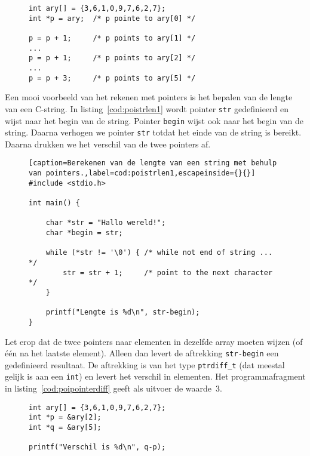 \begin{figure}[!ht]
\begin{lstlisting}[caption=Rekenen met pointers.]
int ary[] = {3,6,1,0,9,7,6,2,7};
int *p = ary;  /* p pointe to ary[0] */

p = p + 1;     /* p points to ary[1] */
...
p = p + 1;     /* p points to ary[2] */
...
p = p + 3;     /* p points to ary[5] */

\end{lstlisting}
\end{figure}

Een mooi voorbeeld van het rekenen met pointers is het bepalen van de lengte van een C-string. In listing~\ref{cod:poistrlen1} wordt pointer \texttt{str} gedefinieerd en wijst naar het begin van de string. Pointer \texttt{begin} wijst ook naar het begin van de string. Daarna verhogen we pointer \texttt{str} totdat het einde van de string is bereikt. Daarna drukken we het verschil van de twee pointers af.

\begin{figure}[!ht]
\begin{lstlisting}[caption=Berekenen van de lengte van een string met behulp van pointers.,label=cod:poistrlen1,escapeinside={}{}]
#include <stdio.h>

int main() {

    char *str = "Hallo wereld!";
    char *begin = str;

    while (*str != '\0') { /* while not end of string ... */
        str = str + 1;     /* point to the next character */
    }

    printf("Lengte is %d\n", str-begin);
}
\end{lstlisting}
\end{figure}

Let erop dat de twee pointers naar elementen in dezelfde array moeten wijzen (of één na het laatste element). Alleen dan levert de aftrekking \texttt{str-begin} een gedefinieerd resultaat. De aftrekking is van het type \texttt{ptrdiff\_t} (dat meestal gelijk is aan een \texttt{int}) en levert het verschil in elementen. Het programmafragment in listing~\ref{cod:poipointerdiff} geeft als uitvoer de waarde~3.

\begin{figure}[!ht]
\begin{lstlisting}[caption=Het berekenen van het verschil van twee pointers.,label=cod:poipointerdiff]
int ary[] = {3,6,1,0,9,7,6,2,7};
int *p = &ary[2];
int *q = &ary[5];

printf("Verschil is %d\n", q-p);
\end{lstlisting}
\end{figure}

